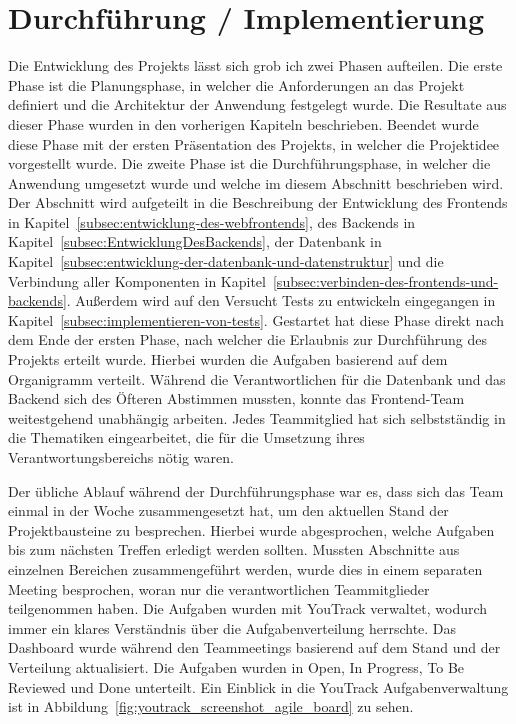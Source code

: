 \section{Durchführung / Implementierung}\label{sec:durchfuehrung-implementierung}

Die Entwicklung des Projekts lässt sich grob ich zwei Phasen aufteilen.
Die erste Phase ist die Planungsphase, in welcher die Anforderungen an das Projekt definiert und die Architektur der Anwendung festgelegt wurde.
Die Resultate aus dieser Phase wurden in den vorherigen Kapiteln beschrieben.
Beendet wurde diese Phase mit der ersten Präsentation des Projekts, in welcher die Projektidee vorgestellt wurde.
Die zweite Phase ist die Durchführungsphase, in welcher die Anwendung umgesetzt wurde und welche im diesem Abschnitt beschrieben wird.
Der Abschnitt wird aufgeteilt in die Beschreibung der Entwicklung des Frontends in Kapitel~\ref{subsec:entwicklung-des-webfrontends}, des Backends in Kapitel~\ref{subsec:EntwicklungDesBackends}, der Datenbank in Kapitel~\ref{subsec:entwicklung-der-datenbank-und-datenstruktur} und die Verbindung aller Komponenten in Kapitel~\ref{subsec:verbinden-des-frontends-und-backends}.
Außerdem wird auf den Versucht Tests zu entwickeln eingegangen in Kapitel~\ref{subsec:implementieren-von-tests}.
Gestartet hat diese Phase direkt nach dem Ende der ersten Phase, nach welcher die Erlaubnis zur Durchführung des Projekts erteilt wurde.
Hierbei wurden die Aufgaben basierend auf dem Organigramm verteilt.
Während die Verantwortlichen für die Datenbank und das Backend sich des Öfteren Abstimmen mussten, konnte das Frontend-Team weitestgehend unabhängig arbeiten.
Jedes Teammitglied hat sich selbstständig in die Thematiken eingearbeitet, die für die Umsetzung ihres Verantwortungsbereichs nötig waren.

Der übliche Ablauf während der Durchführungsphase war es, dass sich das Team einmal in der Woche zusammengesetzt hat, um den aktuellen Stand der Projektbausteine zu besprechen.
Hierbei wurde abgesprochen, welche Aufgaben bis zum nächsten Treffen erledigt werden sollten.
Mussten Abschnitte aus einzelnen Bereichen zusammengeführt werden, wurde dies in einem separaten Meeting besprochen, woran nur die verantwortlichen Teammitglieder teilgenommen haben.
Die Aufgaben wurden mit YouTrack verwaltet, wodurch immer ein klares Verständnis über die Aufgabenverteilung herrschte.
Das Dashboard wurde während den Teammeetings basierend auf dem Stand und der Verteilung aktualisiert.
Die Aufgaben wurden in Open, In Progress, To Be Reviewed und Done unterteilt.
Ein Einblick in die YouTrack Aufgabenverwaltung ist in Abbildung~\ref{fig:youtrack_screenshot_agile_board} zu sehen.

